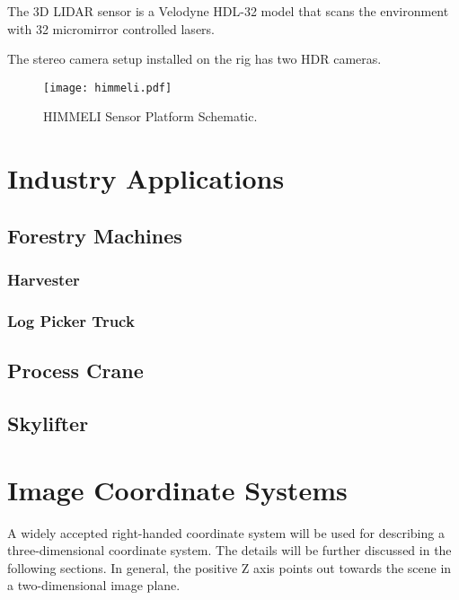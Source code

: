 \documentclass[12pt,a4paper,oneside,pdftex]{report}
\begin{document}
The 3D LIDAR sensor is a Velodyne HDL-32 model that scans the environment with 32 micromirror controlled lasers.

The stereo camera setup installed on the rig has two HDR cameras.

\begin{figure}[ht]
  \begin{center}
    \texttt{[image: himmeli.pdf]}
    \caption{HIMMELI Sensor Platform Schematic.}
    \label{fig:himmeli}
  \end{center}
\end{figure}

\chapter{Industry Applications}

\section{Forestry Machines}

\subsection{Harvester}

\subsection{Log Picker Truck}

\section{Process Crane}

\section{Skylifter}

\chapter{Image Coordinate Systems}

A widely accepted right-handed coordinate system will be used for describing a three-dimensional coordinate system. The details will be further discussed in the following sections. In general, the positive Z axis points out towards the scene in a two-dimensional image plane.
\end{document}
